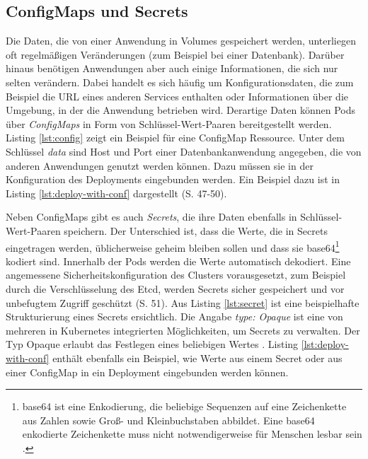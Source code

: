 \documentclass[11pt,a4paper]{article}
\begin{document}
\subsection{ConfigMaps und Secrets}
Die Daten, die von einer Anwendung in Volumes gespeichert werden, unterliegen oft regelmäßigen Veränderungen
(zum Beispiel bei einer Datenbank). Darüber hinaus benötigen Anwendungen aber auch einige Informationen, die sich nur
selten verändern. Dabei handelt es sich häufig um Konfigurationsdaten, die zum Beispiel die URL eines anderen
Services enthalten oder Informationen über die Umgebung, in der die Anwendung betrieben wird.
Derartige Daten können Pods über \emph{ConfigMaps} in Form von Schlüssel-Wert-Paaren bereitgestellt werden.
Listing \ref{lst:config} zeigt ein Beispiel für eine ConfigMap Ressource.
Unter dem Schlüssel \emph{data} sind Host und Port einer Datenbankanwendung angegeben,
die von anderen Anwendungen genutzt werden können. Dazu müssen sie in der Konfiguration des
Deployments eingebunden werden. Ein Beispiel dazu ist in Listing \ref{lst:deploy-with-conf} dargestellt \cite{Schmeling_Dargatz_2022} (S. 47-50).




Neben ConfigMaps gibt es auch \emph{Secrets}, die ihre Daten ebenfalls in Schlüssel-Wert-Paaren speichern.
Der Unterschied ist, dass die Werte, die in Secrets eingetragen werden, üblicherweise geheim bleiben sollen und
dass sie
base64\footnote{base64 ist eine Enkodierung, die beliebige Sequenzen auf eine Zeichenkette aus Zahlen sowie Groß- und Kleinbuchstaben abbildet.
  Eine base64 enkodierte Zeichenkette muss nicht notwendigerweise für Menschen lesbar sein \cite{rfc4648}.} kodiert sind.
Innerhalb der Pods werden die Werte automatisch dekodiert.
Eine angemessene Sicherheitskonfiguration des Clusters vorausgesetzt, zum Beispiel durch die Verschlüsselung des Etcd,
werden Secrets sicher gespeichert und vor unbefugtem Zugriff geschützt \cite{Schmeling_Dargatz_2022} (S. 51).
Aus Listing \ref{lst:secret} ist eine beispielhafte Strukturierung eines Secrets ersichtlich.
Die Angabe \emph{type: Opaque} ist eine von mehreren in Kubernetes integrierten Möglichkeiten,
um Secrets zu verwalten. Der Typ Opaque erlaubt das Festlegen eines beliebigen Wertes \cite{kubernetes.io_secret_types}.
Listing \ref{lst:deploy-with-conf} enthält ebenfalls ein Beispiel, wie Werte aus einem
Secret oder aus einer ConfigMap in ein Deployment eingebunden werden können.
\end{document}

